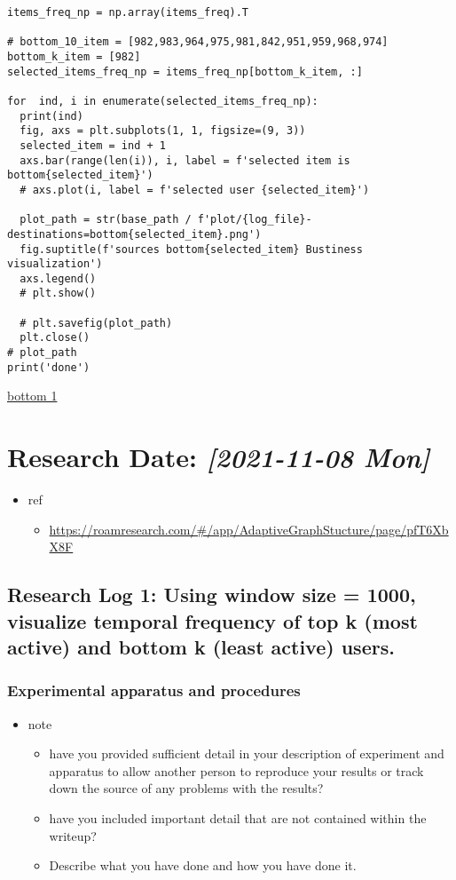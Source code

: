 \documentclass[11pt]{article}
\begin{document}
\begin{enumerate}
\begin{verbatim}
items_freq_np = np.array(items_freq).T

# bottom_10_item = [982,983,964,975,981,842,951,959,968,974]
bottom_k_item = [982]
selected_items_freq_np = items_freq_np[bottom_k_item, :]

for  ind, i in enumerate(selected_items_freq_np):
  print(ind)
  fig, axs = plt.subplots(1, 1, figsize=(9, 3))
  selected_item = ind + 1
  axs.bar(range(len(i)), i, label = f'selected item is bottom{selected_item}')
  # axs.plot(i, label = f'selected user {selected_item}')

  plot_path = str(base_path / f'plot/{log_file}-destinations=bottom{selected_item}.png')
  fig.suptitle(f'sources bottom{selected_item} Bustiness visualization')
  axs.legend()
  # plt.show()

  # plt.savefig(plot_path)
  plt.close()
# plot_path
print('done')
\end{verbatim}


\href{file:///mnt/c/Users/terng/OneDrive/Documents/Working/tgn/plot/1636130420.8830836-destinations=bottom1.png}{bottom 1}
\end{enumerate}


\section{Research Date: \textit{[2021-11-08 Mon]}}
\label{sec:orgf5787e5}
\begin{itemize}
\item ref
\begin{itemize}
\item \url{https://roamresearch.com/\#/app/AdaptiveGraphStucture/page/pfT6XbX8F}
\end{itemize}
\end{itemize}
\subsection{Research Log 1: Using window size = 1000, visualize temporal frequency of top k (most active) and bottom k (least active) users.}
\label{sec:orgfbf74ad}

\subsubsection{Experimental apparatus and procedures}
\label{sec:org8ab67fe}
\begin{itemize}
\item note
\begin{itemize}
\item have you provided sufficient detail in your description of experiment and apparatus to allow another person to reproduce your results or track down the source of any problems with the results?
\item have you included important detail that are not contained within the writeup?
\item Describe what you have done and how you have done it.
\end{itemize}
\end{itemize}
\end{document}
